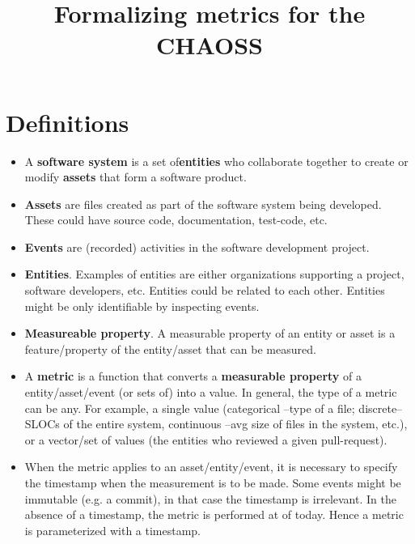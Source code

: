 \documentclass[11pt]{article}
\title{Formalizing metrics for the CHAOSS}
\begin{document}
\maketitle

\section{Definitions}
\label{sec:definitions}

\begin{itemize}
\item 

A \textbf{software system} is a set of\textbf{entities} who collaborate together to create or modify \textbf{assets} that
form a software product.


\item \textbf{Assets} are files created as part of the software system being developed. These could have source code,
  documentation, test-code, etc.

\item \textbf{Events} are (recorded) activities in the software development project.

\item \textbf{Entities}. Examples of entities are either organizations supporting a project, software developers, etc.
  Entities could be related to each other. Entities might be only identifiable by inspecting events.

\item \textbf{Measureable property}. A measurable property of an entity or asset is a feature/property of the
  entity/asset that can be measured. 

\item A \textbf{metric} is a function that converts a \textbf{measurable property} of a entity/asset/event (or sets of) into a value. 
  In general, the type of a metric can be any. For example, a single value (categorical --type of a file;
  discrete--SLOCs of the entire system, continuous --avg size of files in the system, etc.), or
  a vector/set of values (the entities who reviewed a given pull-request). 

\item When the metric applies to an asset/entity/event, it is necessary to specify the timestamp when  the measurement is to be
  made. Some events might be immutable (e.g. a commit), in that case the timestamp is irrelevant. In the absence of a
  timestamp,   the metric is performed at of today. Hence a metric is parameterized with a timestamp.

\end{itemize}
\end{document}
